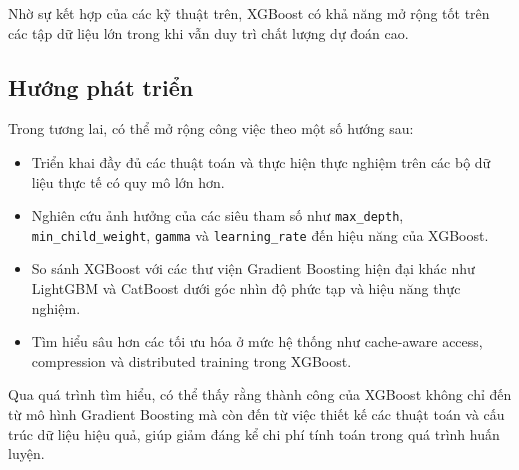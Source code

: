Nhờ sự kết hợp của các kỹ thuật trên, XGBoost có khả năng mở rộng tốt trên các tập dữ liệu lớn trong khi vẫn duy trì chất lượng dự đoán cao.

\subsection{Hướng phát triển}

Trong tương lai, có thể mở rộng công việc theo một số hướng sau:

\begin{itemize}
    \item Triển khai đầy đủ các thuật toán và thực hiện thực nghiệm trên các bộ dữ liệu thực tế có quy mô lớn hơn.
    \item Nghiên cứu ảnh hưởng của các siêu tham số như \texttt{max\_depth}, \texttt{min\_child\_weight}, \texttt{gamma} và \texttt{learning\_rate} đến hiệu năng của XGBoost.
    \item So sánh XGBoost với các thư viện Gradient Boosting hiện đại khác như LightGBM và CatBoost dưới góc nhìn độ phức tạp và hiệu năng thực nghiệm.
    \item Tìm hiểu sâu hơn các tối ưu hóa ở mức hệ thống như cache-aware access, compression và distributed training trong XGBoost.
\end{itemize}

Qua quá trình tìm hiểu, có thể thấy rằng thành công của XGBoost không chỉ đến từ mô hình Gradient Boosting mà còn đến từ việc thiết kế các thuật toán và cấu trúc dữ liệu hiệu quả, giúp giảm đáng kể chi phí tính toán trong quá trình huấn luyện.